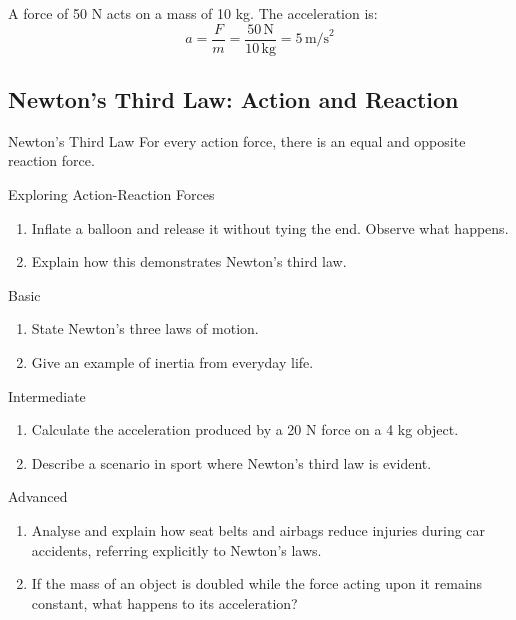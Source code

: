 \begin{example}
A force of 50 N acts on a mass of 10 kg. The acceleration is:
\[
a = \frac{F}{m} = \frac{50\,\text{N}}{10\,\text{kg}} = 5\,\text{m/s}^2
\]
\end{example}

\subsection{Newton's Third Law: Action and Reaction}

\begin{keyconcept}{Newton's Third Law}
For every action force, there is an equal and opposite reaction force.
\end{keyconcept}

\begin{investigation}{Exploring Action-Reaction Forces}
\begin{enumerate}
    \item Inflate a balloon and release it without tying the end. Observe what happens.
    \item Explain how this demonstrates Newton's third law.
\end{enumerate}
\end{investigation}

\begin{tieredquestions}{Basic}
\begin{enumerate}
    \item State Newton’s three laws of motion.
    \item Give an example of inertia from everyday life.
\end{enumerate}
\end{tieredquestions}

\begin{tieredquestions}{Intermediate}
\begin{enumerate}
    \item Calculate the acceleration produced by a 20 N force on a 4 kg object.
    \item Describe a scenario in sport where Newton’s third law is evident.
\end{enumerate}
\end{tieredquestions}

\begin{tieredquestions}{Advanced}
\begin{enumerate}
    \item Analyse and explain how seat belts and airbags reduce injuries during car accidents, referring explicitly to Newton’s laws.
    \item If the mass of an object is doubled while the force acting upon it remains constant, what happens to its acceleration?
\end{enumerate}
\end{tieredquestions}

